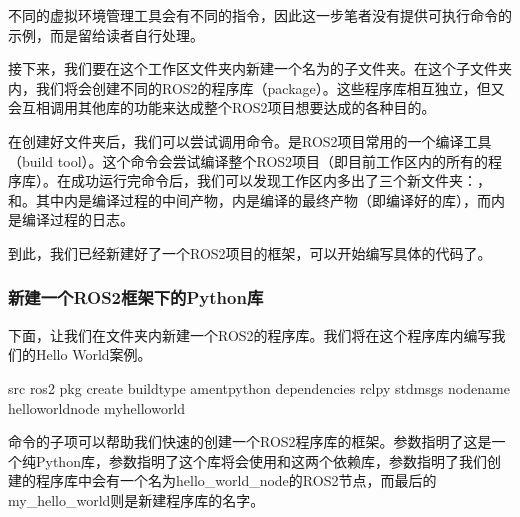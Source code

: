 \documentclass[letterpaper,10pt,english]{sphinxmanual}
\begin{document}
\sphinxAtStartPar
不同的虚拟环境管理工具会有不同的指令，因此这一步笔者没有提供可执行命令的示例，而是留给读者自行处理。

\sphinxAtStartPar
接下来，我们要在这个工作区文件夹内新建一个名为的子文件夹。在这个子文件夹内，我们将会创建不同的ROS2的程序库（package）。这些程序库相互独立，但又会互相调用其他库的功能来达成整个ROS2项目想要达成的各种目的。

\sphinxAtStartPar
在创建好文件夹后，我们可以尝试调用命令。是ROS2项目常用的一个编译工具（build
tool）。这个命令会尝试编译整个ROS2项目（即目前工作区内的所有的程序库）。在成功运行完命令后，我们可以发现工作区内多出了三个新文件夹：，和。其中内是编译过程的中间产物，内是编译的最终产物（即编译好的库），而内是编译过程的日志。

\sphinxAtStartPar
到此，我们已经新建好了一个ROS2项目的框架，可以开始编写具体的代码了。


\subsubsection{新建一个ROS2框架下的Python库}
\label{\detokenize{chapter_rl_sys/ros_code_ex:ros2python}}
\sphinxAtStartPar
下面，让我们在文件夹内新建一个ROS2的程序库。我们将在这个程序库内编写我们的Hello
World案例。

\begin{sphinxVerbatim}[commandchars=\\\{\}]
 src
ros2 pkg create \PYGZhy{}\PYGZhy{}build\PYGZhy{}type ament\PYGZus{}python \PYGZhy{}\PYGZhy{}dependencies rclpy std\PYGZus{}msgs \PYGZhy{}\PYGZhy{}node\PYGZhy{}name hello\PYGZus{}world\PYGZus{}node my\PYGZus{}hello\PYGZus{}world
\end{sphinxVerbatim}

\sphinxAtStartPar
{}命令的子项可以帮助我们快速的创建一个ROS2程序库的框架。参数指明了这是一个纯Python库，参数指明了这个库将会使用和这两个依赖库，参数指明了我们创建的程序库中会有一个名为hello\_world\_node的ROS2节点，而最后的my\_hello\_world则是新建程序库的名字。
\end{document}

